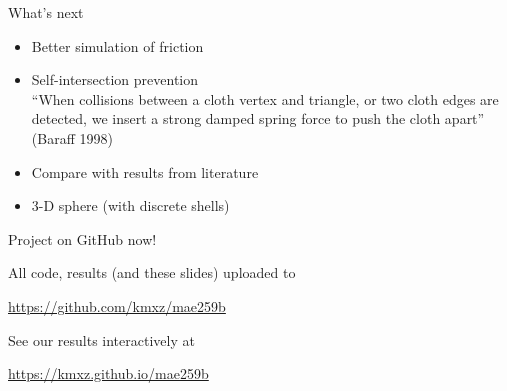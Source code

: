 \documentclass{beamer}
\newlength{\currentparskip}
\newenvironment{minipageparskip}[1]{\setlength{\currentparskip}{\parskip}\begin{minipage}{#1}\setlength{\parskip}{\currentparskip}}{\end{minipage}}
\begin{document}
	\begin{frame}{What's next}
		\begin{itemize}
			\item Better simulation of friction
			\item Self-intersection prevention\\
			{\footnotesize ``When collisions between a cloth vertex and triangle, or two cloth edges are detected, we insert a strong damped spring force to push the cloth apart'' (Baraff 1998)} 
			\item Compare with results from literature
			\item 3-D sphere (with discrete shells)
		\end{itemize}
	\end{frame}
	\begin{frame}{Project on GitHub now!}
		\begin{minipageparskip}{0.675\textwidth}
			All code, results (and these slides) uploaded to
	
			\url{https://github.com/kmxz/mae259b}
		
			See our results interactively at
		
			\url{https://kmxz.github.io/mae259b}
		\end{minipageparskip}%
		\hspace{0.025\textwidth}%
		\begin{minipageparskip}{0.3\textwidth}
		\end{minipageparskip}
	\end{frame}
\end{document}
